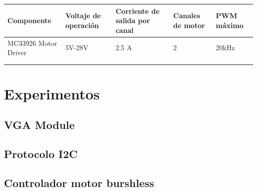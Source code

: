 \begin{table}[H]
	\begin{tabular}{lllll}
		\hline
		\multicolumn{1}{|l|}{Componente}           & \multicolumn{1}{l|}{Voltaje de operación} & \multicolumn{1}{l|}{Corriente de salida por canal} & \multicolumn{1}{l|}{Canales de motor} & \multicolumn{1}{l|}{PWM máximo} \\ \hline
		\multicolumn{1}{|l|}{MC33926 Motor Driver} & \multicolumn{1}{l|}{5V-28V}               & \multicolumn{1}{l|}{2.5 A}                         & \multicolumn{1}{l|}{2}                & \multicolumn{1}{l|}{20kHz}      \\ \hline
		&                                           &                                                    &                                       &                                 \\
		&                                           &                                                    &                                       &                                
	\end{tabular}
\end{table}


\section{Experimentos}
\subsection{VGA Module}
\subsection{Protocolo I2C}
\subsection{Controlador motor burshless}